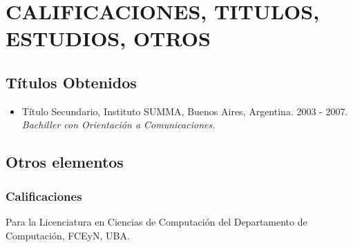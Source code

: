 \documentclass[a4paper,10pt]{article}
\begin{document}
\section{CALIFICACIONES, TITULOS, ESTUDIOS, OTROS}

\subsection{Títulos Obtenidos}

\begin{itemize}
    \item {Título Secundario, Instituto SUMMA, Buenos Aires, Argentina. 2003
            - 2007. \\
        {\small \itshape Bachiller con Orientación a Comunicaciones.}}
\end{itemize}

\subsection{Otros elementos}

\subsubsection{Calificaciones}

Para la Licenciatura en Ciencias de Computación del Departamento de
Computación, FCEyN, UBA.
\end{document}
